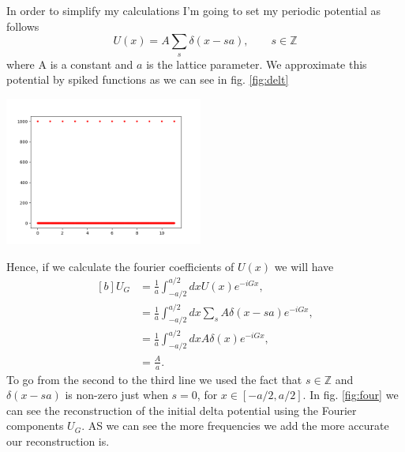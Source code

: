
\begin{questions}
\begin{solution}
  In order to simplify my calculations I'm going to set my periodic potential as follows
  \begin{equation}
    U(x) = A\sum_{s}\delta(x-sa),\qquad s\in \mathbb{Z}
  \end{equation}
  where A is a constant and $a$ is the lattice parameter. We approximate this potential by spiked functions as we can see in fig. \ref{fig:delt}

  \begin{center}
    \includegraphics[width=65mm]{delta}
  \end{center}

  \label{fig:delt}\vspace{0.5cm}

  Hence, if we calculate the fourier coefficients of $U(x)$ we will have
  \begin{equation}
    \begin{aligned}[b]
      U_G &= \frac{1}{a}\int_{-a/2}^{a/2}dx U(x)e^{-iGx},\\
      &= \frac{1}{a}\int_{-a/2}^{a/2}dx \sum_s A \delta (x-sa)e^{-iGx},\\
      &= \frac{1}{a}\int_{-a/2}^{a/2}dx A \delta (x)e^{-iGx},\\
      &= \frac{A}{a}.
    \end{aligned}
  \end{equation}
To go from the second to the third line we used the fact that $s\in \mathbb{Z}$ and $\delta (x-sa)$ is non-zero just when $s=0$, for $x\in [-a/2,a/2].$ In fig. \ref{fig:four} we can see the reconstruction of the initial delta potential using the Fourier components $U_G$. AS we can see the more frequencies we add the more accurate our reconstruction is.


\end{solution}
\end{questions}

